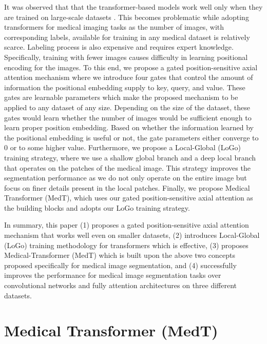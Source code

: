 \documentclass[runningheads]{llncs}
\begin{document}
	 It was observed that that the transformer-based models work well only when they are trained on large-scale datasets \cite{dosovitskiy2020image}. This becomes problematic while adopting transformers for medical imaging tasks as the number of images, with corresponding labels, available for training in any medical dataset is relatively scarce. Labeling process is also expensive and requires expert knowledge. Specifically, training with fewer images causes difficulty in learning positional encoding for the images. To this end, we propose a gated position-sensitive axial attention mechanism where we introduce four gates that control the amount of information the positional embedding supply to key, query, and value. These gates are learnable parameters which make the proposed mechanism to be applied to any dataset of any size. Depending on the size of the dataset, these gates would learn whether the number of images would be sufficient enough to learn proper position embedding. Based on whether the information learned by the positional embedding is useful or not, the gate parameters either converge to 0 or to some higher value. Furthermore, we propose a Local-Global (LoGo) training strategy, where we use a shallow global branch and a deep local branch that operates on the patches of the medical image. This strategy improves the segmentation performance  as we do not only operate on the entire image but focus on finer details present in the local patches. Finally, we propose Medical Transformer (MedT), which uses our gated position-sensitive axial attention as the building blocks and adopts our LoGo training strategy.
	 
	 In summary, this paper (1) proposes a gated position-sensitive axial attention mechanism that works well even on smaller datasets, (2) introduces Local-Global (LoGo) training methodology for transformers which is effective, (3) proposes Medical-Transformer (MedT) which is built upon the above two concepts proposed specifically for medical image segmentation, and (4) successfully improves the performance for medical image segmentation tasks over convolutional networks and fully attention architectures on three different datasets.
	 
	 
	\section{Medical Transformer (MedT)}
	


		
\end{document}
